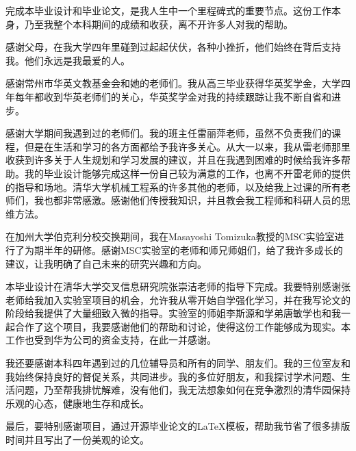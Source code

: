\begin{acknowledgement}
完成本毕业设计和毕业论文，是我人生中一个里程碑式的重要节点。这份工作本身，乃至我整个本科期间的成绩和收获，离不开许多人对我的帮助。

感谢父母，在我大学四年里碰到过起起伏伏，各种小挫折，他们始终在背后支持我。他们永远是我最爱的人。

感谢常州市华英文教基金会和她的老师们。我从高三毕业获得华英奖学金，大学四年每年都收到华英老师们的关心，华英奖学金对我的持续跟踪让我不断自省和进步。

感谢大学期间我遇到过的老师们。我的班主任雷丽萍老师，虽然不负责我们的课程，但是在生活和学习的各方面都给予我许多关心。从大一以来，我从雷老师那里收获到许多关于人生规划和学习发展的建议，并且在我遇到困难的时候给我许多帮助。我的毕业设计能够完成这样一份自己较为满意的工作，也离不开雷老师的提供的指导和场地。清华大学机械工程系的许多其他的老师，以及给我上过课的所有老师们，我也都非常感激。感谢他们传授我知识，并且教会我工程师和科研人员的思维方法。

在加州大学伯克利分校交换期间，我在Masayoshi Tomizuka教授的MSC实验室进行了为期半年的研修。感谢MSC实验室的老师和师兄师姐们，给了我许多成长的建议，让我明确了自己未来的研究兴趣和方向。

本毕业设计在清华大学交叉信息研究院张崇洁老师的指导下完成。我要特别感谢张老师给我加入实验室项目的机会，允许我从零开始自学强化学习，并在我写论文的阶段给我提供了大量细致入微的指导。实验室的师姐李斯源和学弟唐敏学也和我一起合作了这个项目，我要感谢他们的帮助和讨论，使得这份工作能够成为现实。本工作也受到华为公司的资金支持，在此一并感谢。

我还要感谢本科四年遇到过的几位辅导员和所有的同学、朋友们。我的三位室友和我始终保持良好的督促关系，共同进步。我的多位好朋友，和我探讨学术问题、生活问题，乃至帮我排忧解难，没有他们，我无法想象如何在竞争激烈的清华园保持乐观的心态，健康地生存和成长。

最后，要特别感谢\thuthesis\cite{thuthesis}项目，通过开源毕业论文的\LaTeX 模板，帮助我节省了很多排版时间并且写出了一份美观的论文。

\end{acknowledgement}
